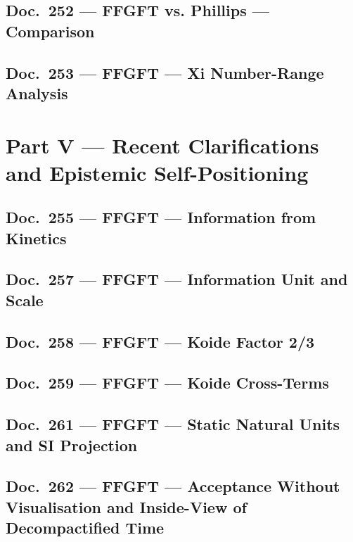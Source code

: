 	\chapter{Doc.~252 --- FFGFT vs. Phillips — Comparison}
	
	\chapter{Doc.~253 --- FFGFT — Xi Number-Range Analysis}
	
	\part{Part V --- Recent Clarifications and Epistemic Self-Positioning}
	\chapter{Doc.~255 --- FFGFT — Information from Kinetics}
	
	\chapter{Doc.~257 --- FFGFT — Information Unit and Scale}
	
	\chapter{Doc.~258 --- FFGFT — Koide Factor 2/3}
	
	\chapter{Doc.~259 --- FFGFT — Koide Cross-Terms}
	
	\chapter{Doc.~261 --- FFGFT — Static Natural Units and SI Projection}
	
	\chapter{Doc.~262 --- FFGFT — Acceptance Without Visualisation and Inside-View of Decompactified Time}
	

